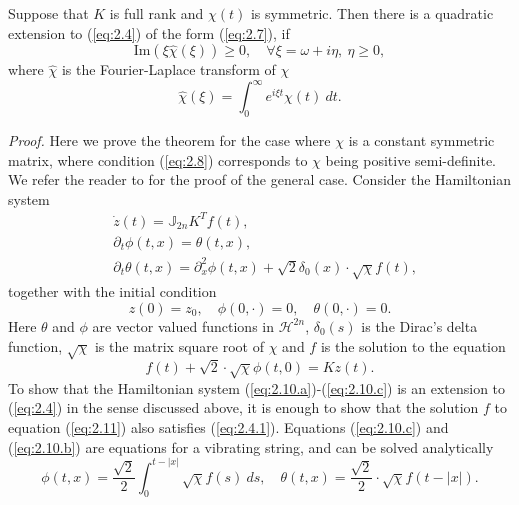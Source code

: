 \begin{theorem}
Suppose that $K$ is full rank and $\chi(t)$ is symmetric. Then there is a quadratic extension to (\ref{eq:2.4}) of the form (\ref{eq:2.7}), if
\begin{equation} \label{eq:2.8}
	\text{Im}(\xi\hat{\chi}(\xi)) \geq 0, \quad \forall \xi = \omega + i\eta, \ \eta \geq 0,
\end{equation}
where $\hat{\chi}$ is the Fourier-Laplace transform of $\chi$
\begin{equation} \label{eq:2.9}
	\hat{\chi}(\xi) = \int_0^\infty e^{i\xi t} \chi(t)\ dt.
\end{equation}
\end{theorem}
\emph{Proof.} Here we prove the theorem for the case where $\chi$ is a constant symmetric matrix, where condition (\ref{eq:2.8}) corresponds to $\chi$ being positive semi-definite. We refer the reader to \cite{Figotin:2006jy} for the proof of the general case. Consider the Hamiltonian system
\begin{subequations}
\begin{align}
		\label{eq:2.10.a} & \dot{z}(t) = \mathbb J_{2n} K^T f(t), \\
		\label{eq:2.10.c} & \partial_t \phi(t,x) = \theta(t,x), \\
		\label{eq:2.10.b} & \partial_t \theta(t,x) = \partial_x^2 \phi(t,x) + \sqrt 2 \delta_0(x) \cdot \sqrt{\chi}  f(t), 
\end{align}
\end{subequations}
together with the initial condition
\begin{equation} \label{eq:2.10.1}
	z(0) = z_0,\quad \phi(0,\cdot) = 0, \quad \theta(0,\cdot) = 0.
\end{equation}
Here $\theta$ and $\phi$ are vector valued functions in $\mathcal H^{2n}$, $\delta_0(s)$ is the Dirac's delta function, $\sqrt{ \chi}$ is the matrix square root of $\chi$ and $f$ is the solution to the equation
\begin{equation} \label{eq:2.11}
	f(t) + \sqrt{2} \cdot \sqrt{ \chi } \phi(t,0) = Kz(t).
\end{equation}
To show that the Hamiltonian system (\ref{eq:2.10.a})-(\ref{eq:2.10.c}) is an extension to (\ref{eq:2.4}) in the sense discussed above, it is enough to show that the solution $f$ to equation (\ref{eq:2.11}) also satisfies (\ref{eq:2.4.1}). Equations (\ref{eq:2.10.c}) and (\ref{eq:2.10.b}) are equations for a vibrating string, and can be solved analytically
\begin{equation} \label{eq:2.12}
	\phi(t,x) = \frac {\sqrt 2} 2 \int_0^{t-|x|} \sqrt{\chi} f(s)\ ds,\quad \theta(t,x) = \frac{\sqrt 2}{2} \cdot \sqrt{\chi} f(t - |x|).
\end{equation}
